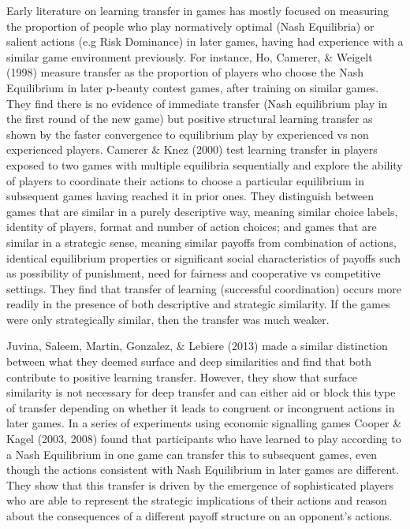 \documentclass[man,floatsintext]{apa6}
\begin{document}
Early literature on learning transfer in games has mostly focused on measuring the proportion of people who play normatively optimal (Nash Equilibria) or salient actions (e.g Risk Dominance) in later games, having had experience with a similar game environment previously. For instance, Ho, Camerer, \& Weigelt (1998) measure transfer as the proportion of players who choose the Nash Equilibrium in later p-beauty contest games, after training on similar games. They find there is no evidence of immediate transfer (Nash equilibrium play in the first round of the new game) but positive structural learning transfer as shown by the faster convergence to equilibrium play by experienced vs non experienced players. Camerer \& Knez (2000) test learning transfer in players exposed to two games with multiple equilibria sequentially and explore the ability of players to coordinate their actions to choose a particular equilibrium in subsequent games having reached it in prior ones. They distinguish between games that are similar in a purely descriptive way, meaning similar choice labels, identity of players, format and number of action choices; and games that are similar in a strategic sense, meaning similar payoffs from combination of actions, identical equilibrium properties or significant social characteristics of payoffs such as possibility of punishment, need for fairness and cooperative vs competitive settings. They find that transfer of learning (successful coordination) occurs more readily in the presence of both descriptive and strategic similarity. If the games were only strategically similar, then the transfer was much weaker.

Juvina, Saleem, Martin, Gonzalez, \& Lebiere (2013) made a similar distinction between what they deemed surface and deep similarities and find that both contribute to positive learning transfer. However, they show that surface similarity is not necessary for deep transfer and can either aid or block this type of transfer depending on whether it leads to congruent or incongruent actions in later games. In a series of experiments using economic signalling games Cooper \& Kagel (2003, 2008) found that participants who have learned to play according to a Nash Equilibrium in one game can transfer this to subsequent games, even though the actions consistent with Nash Equilibrium in later games are different. They show that this transfer is driven by the emergence of sophisticated players who are able to represent the strategic implications of their actions and reason about the consequences of a different payoff structure on an opponent's actions.
\end{document}
